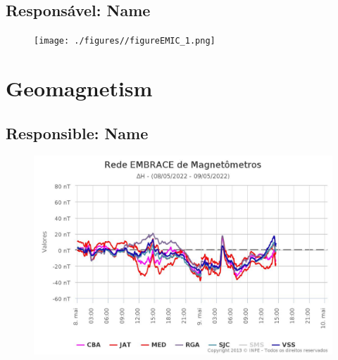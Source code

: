 \documentclass[a4paper, 10pt]{article}
\begin{document}
 \subsection{Responsável: Name} 
 
\begin{figure}[H]
    
                        \centering
   
                             \texttt{[image: ./figures//figureEMIC\_1.png]}

                        \end{figure}

                     \section{Geomagnetism} 
 \subsection{Responsible: Name} 
 
\begin{figure}[H]
    
                        \centering
   
                             \includegraphics[width=14cm]{./figures//figureGeomag_0.png}

                        \end{figure}
\end{document}
